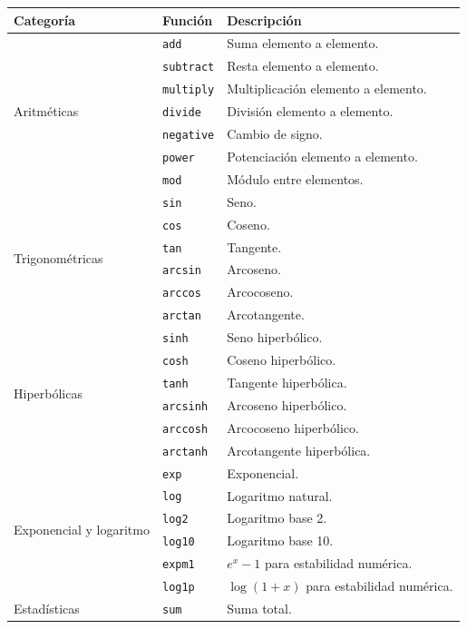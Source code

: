 \documentclass{article}
\theoremstyle{nonumberplain}
\begin{document}
\begin{center}
\renewcommand{\arraystretch}{1.25}
\begin{longtable}{|p{4cm}|p{3.5cm}|p{7cm}|}
\hline
\textbf{Categoría} & \textbf{Función} & \textbf{Descripción} \\
\hline
\multirow{7}{*}{Aritméticas} & \texttt{add} & Suma elemento a elemento. \\
& \texttt{subtract} & Resta elemento a elemento. \\
& \texttt{multiply} & Multiplicación elemento a elemento. \\
& \texttt{divide} & División elemento a elemento. \\
& \texttt{negative} & Cambio de signo. \\
& \texttt{power} & Potenciación elemento a elemento. \\
& \texttt{mod} & Módulo entre elementos. \\
\hline
\multirow{6}{*}{Trigonométricas} & \texttt{sin} & Seno. \\
& \texttt{cos} & Coseno. \\
& \texttt{tan} & Tangente. \\
& \texttt{arcsin} & Arcoseno. \\
& \texttt{arccos} & Arcocoseno. \\
& \texttt{arctan} & Arcotangente. \\
\hline
\multirow{6}{*}{Hiperbólicas} & \texttt{sinh} & Seno hiperbólico. \\
& \texttt{cosh} & Coseno hiperbólico. \\
& \texttt{tanh} & Tangente hiperbólica. \\
& \texttt{arcsinh} & Arcoseno hiperbólico. \\
& \texttt{arccosh} & Arcocoseno hiperbólico. \\
& \texttt{arctanh} & Arcotangente hiperbólica. \\
\hline
\multirow{6}{*}{Exponencial y logaritmo} & \texttt{exp} & Exponencial. \\
& \texttt{log} & Logaritmo natural. \\
& \texttt{log2} & Logaritmo base 2. \\
& \texttt{log10} & Logaritmo base 10. \\
& \texttt{expm1} & $e^x - 1$ para estabilidad numérica. \\
& \texttt{log1p} & $\log(1 + x)$ para estabilidad numérica. \\
\hline
\multirow{7}{*}{Estadísticas} & \texttt{sum} & Suma total. \\

\end{longtable}
\end{center}
\end{document}
